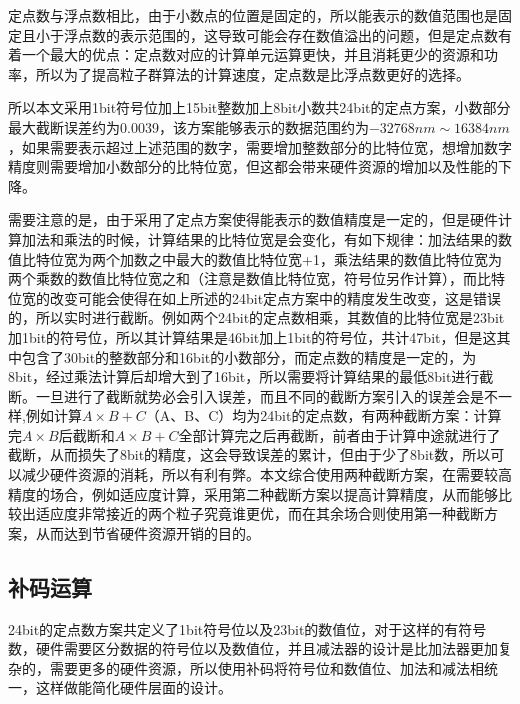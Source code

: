 定点数与浮点数相比，由于小数点的位置是固定的，所以能表示的数值范围也是固定且小于浮点数的表示范围的，这导致可能会存在数值溢出的问题，但是定点数有着一个最大的优点：定点数对应的计算单元运算更快，并且消耗更少的资源和功率，所以为了提高粒子群算法的计算速度，定点数是比浮点数更好的选择。

所以本文采用1bit符号位加上15bit整数加上8bit小数共24bit的定点方案，小数部分最大截断误差约为0.0039，该方案能够表示的数据范围约为$-32768nm\sim16384nm$，如果需要表示超过上述范围的数字，需要增加整数部分的比特位宽，想增加数字精度则需要增加小数部分的比特位宽，但这都会带来硬件资源的增加以及性能的下降。

需要注意的是，由于采用了定点方案使得能表示的数值精度是一定的，但是硬件计算加法和乘法的时候，计算结果的比特位宽是会变化，有如下规律：加法结果的数值比特位宽为两个加数之中最大的数值比特位宽+1，乘法结果的数值比特位宽为两个乘数的数值比特位宽之和（注意是数值比特位宽，符号位另作计算），而比特位宽的改变可能会使得在如上所述的24bit定点方案中的精度发生改变，这是错误的，所以实时进行截断。例如两个24bit的定点数相乘，其数值的比特位宽是23bit加1bit的符号位，所以其计算结果是46bit加上1bit的符号位，共计47bit，但是这其中包含了30bit的整数部分和16bit的小数部分，而定点数的精度是一定的，为8bit，经过乘法计算后却增大到了16bit，所以需要将计算结果的最低8bit进行截断。一旦进行了截断就势必会引入误差，而且不同的截断方案引入的误差会是不一样,例如计算$A\times B+C$（A、B、C）均为24bit的定点数，有两种截断方案：计算完$A\times B$后截断和$A\times B+C$全部计算完之后再截断，前者由于计算中途就进行了截断，从而损失了8bit的精度，这会导致误差的累计，但由于少了8bit数，所以可以减少硬件资源的消耗，所以有利有弊。本文综合使用两种截断方案，在需要较高精度的场合，例如适应度计算，采用第二种截断方案以提高计算精度，从而能够比较出适应度非常接近的两个粒子究竟谁更优，而在其余场合则使用第一种截断方案，从而达到节省硬件资源开销的目的。

\subsection{补码运算}
24bit的定点数方案共定义了1bit符号位以及23bit的数值位，对于这样的有符号数，硬件需要区分数据的符号位以及数值位，并且减法器的设计是比加法器更加复杂的，需要更多的硬件资源，所以使用补码将符号位和数值位、加法和减法相统一，这样做能简化硬件层面的设计。

